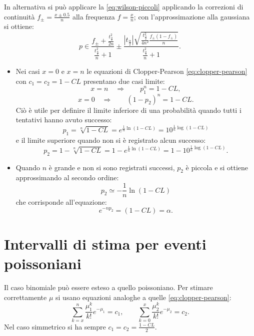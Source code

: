 In alternativa si può applicare la \ref{eq:wilson-piccoli} applicando la correzioni di continuità $f_\pm=\frac{x\pm 0.5}{n}$ alla frequenza $f=\frac{x}{n}$; con l'approssimazione alla gaussiana si ottiene:
\begin{equation}
\label{eq:CL-normale}
p\in \frac { f_{ \pm  }+\frac { t^{ 2 }_{ \frac { \alpha  }{ 2 }  } }{ 2n }  }{ \frac { t^{ 2 }_{ \frac { \alpha  }{ 2 }  } }{ n } +1 } \pm \frac { \left| t_{ \frac { \alpha  }{ 2 }  } \right| \sqrt { \frac { t^{ 2 }_{ \frac { \alpha  }{ 2 }  } }{ 4n^{ 2 } } \frac { f_{ \pm  }\left( 1-f_{ \pm  } \right)  }{ n }  }  }{ \frac { t^{ 2 }_{ \frac { \alpha  }{ 2 }  } }{ n } +1 } .
\end{equation}
\begin{itemize}
\item Nei casi $x=0$ e $x=n$ le equazioni di Clopper-Pearson \ref{eq:clopper-pearson} con $c_1=c_2=1-CL$ presentano due casi limite:
\[
x=n\quad \Rightarrow \qquad { p }_{ 1 }^{ n }=1-CL,
\]
\[
x=0\quad \Rightarrow \qquad { \left( 1-{ p }_{ 2 } \right)  }^{ n }=1-CL.
\]
Ciò è utile per definire il limite inferiore di una probabilità quando tutti i tentativi hanno avuto successo:
\begin{equation}
{ p }_{ 1 }=\sqrt [ n ]{ 1-CL } ={ e }^{ \frac { 1 }{ n } \ln { \left( 1-CL \right)  }  }={ 10 }^{ \frac { 1 }{ n } \log { \left( 1-CL \right)  }  }
\end{equation}
e il limite superiore quando non si è registrato alcun successo:
\begin{equation}
{ p }_{ 2 }=1-\sqrt [ n ]{ 1-CL } =1-{ e }^{ \frac { 1 }{ n } \ln { \left( 1-CL \right)  }  }=1-{ 10 }^{ \frac { 1 }{ n } \log { \left( 1-CL \right)  }  }.
\end{equation}
\item Quando $n$ è grande e non si sono registrati successi, $p_2$ è piccola e si ottiene approssimando al secondo ordine:
\[
{ p }_{ 2 }\simeq -\frac { 1 }{ n } \ln { \left( 1-CL \right)  } 
\]
che corrisponde all'equazione:
\begin{equation}
{ e }^{ -np_{ 2 } }=\left( 1-CL \right) =\alpha .
\end{equation}
\end{itemize}

\section{Intervalli di stima per eventi poissoniani} %
\label{sec:intervalli-stima-poisson}
Il caso binomiale può essere esteso a quello poissoniano. Per stimare correttamente $\mu$ si usano equazioni analoghe a quelle \ref{eq:clopper-pearson}:
\begin{equation}
\label{eq:intervalli-eventi-poisson}
\sum _{ k=x }^{ n }{ { \frac { { \mu  }_{ 1 }^{ k } }{ k! }  }{ e }^{ -{ \mu  }_{ 1 } } } ={ c }_{ 1 },\qquad \sum _{ k=0 }^{ x }{ { \frac { { \mu  }_{ 2 }^{ k } }{ k! }  }{ e }^{ -{ \mu  }_{ 2 } } } ={ c }_{ 2 }.
\end{equation}
Nel caso simmetrico si ha sempre $c_1=c_2=\frac{1-CL}{2}$.

